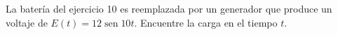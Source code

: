 \item La batería del ejercicio 10 es reemplazada por un generador que produce un voltaje de $E(t) = 12 \operatorname{sen} 10t$. Encuentre la carga en el tiempo $t$.
